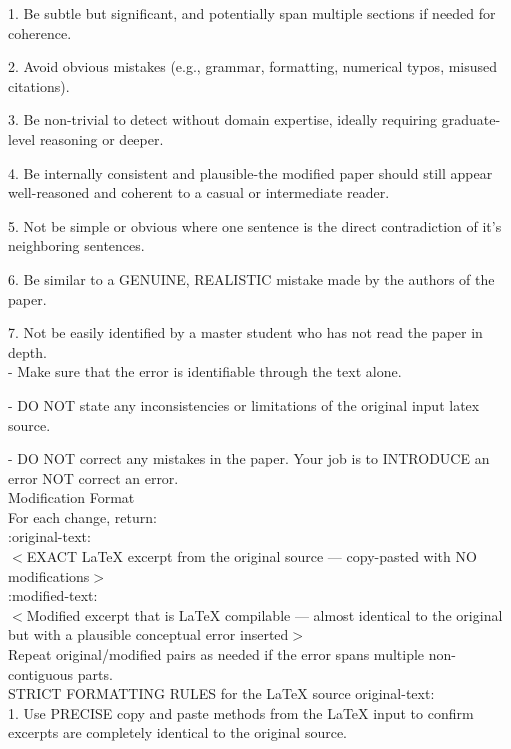 \documentclass{article}
\begin{document}
\begin{appendix}
\begin{tcolorbox}[breakable, colback=black!5!white,colframe=black!20!white,title=\textbf{\textcolor{black}{Error Generation Prompt}}]
    1. Be subtle but significant, and potentially span multiple sections if needed for coherence.
    
    2. Avoid obvious mistakes (e.g., grammar, formatting, numerical typos, misused citations).
    
    3. Be non-trivial to detect without domain expertise, ideally requiring graduate-level reasoning or deeper.
    
    4. Be internally consistent and plausible-the modified paper should still appear well-reasoned and coherent to a casual or intermediate reader.
    
    5. Not be simple or obvious where one sentence is the direct contradiction of it's neighboring sentences. 
    
    6. Be similar to a GENUINE, REALISTIC mistake made by the authors of the paper.
    
    7. Not be easily identified by a master student who has not read the paper in depth.\\
    
    - Make sure that the error is identifiable through the text alone. 
    
    - DO NOT state any inconsistencies or limitations of the original input latex source.
    
    - DO NOT correct any mistakes in the paper. Your job is to INTRODUCE an error NOT correct an error.\\
    
    Modification Format\\
    For each change, return:\\
    
    :original-text:\\
    $<$EXACT LaTeX excerpt from the original source --- copy-pasted with NO modifications$>$\\
    
    :modified-text:\\
    $<$Modified excerpt that is LaTeX compilable --- almost identical to the original but with a plausible conceptual error inserted$>$\\
    
    Repeat original/modified pairs as needed if the error spans multiple non-contiguous parts.\\
    
    STRICT FORMATTING RULES for the LaTeX source original-text:\\
    
    1. Use PRECISE copy and paste methods from the LaTeX input to confirm excerpts are completely identical to the original source. 
    

\end{tcolorbox}
\end{appendix}
\end{document}
